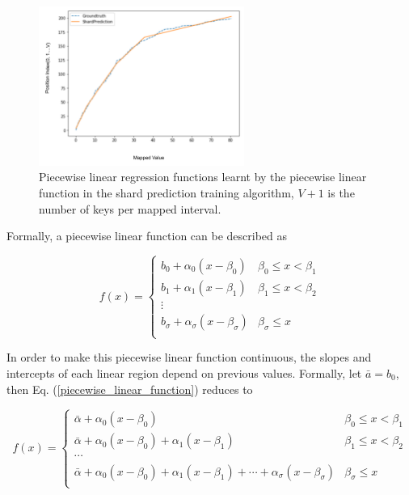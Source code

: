 \begin{figure}[t]
    \centering
	\includegraphics[width=0.6\textwidth]{graphs/implementation/shardPrediction.pdf}
    \caption{Piecewise linear regression functions learnt by the piecewise linear function in the shard prediction training algorithm, $V+1$ is the number of keys per mapped interval.}
    \label{shardPrediction}
\end{figure}

Formally, a piecewise linear function can be described as 

\begin{equation}
\label{piecewise_linear_function}
	f(x)= \begin{cases} 
      b_0+\alpha_0(x-\beta_0) & \beta_0\leq x < \beta_1 \\
      b_1+\alpha_1(x-\beta_1) &  \beta_1\leq x < \beta_2 \\
      \vdots \\
      b_\sigma+\alpha_\sigma(x-\beta_\sigma) &  \beta_\sigma\leq x \\
   \end{cases}
\end{equation}

In order to make this piecewise linear function continuous, the slopes and intercepts of each linear region depend on previous values. Formally, let $\bar{a}=b_0$, then Eq. (\ref{piecewise_linear_function}) reduces to

\begin{equation}
	\label{continuous_piecewise_linear_function}
	f(x)= \begin{cases} 
      \bar{\alpha}+\alpha_0(x-\beta_0) & \beta_0\leq x < \beta_1 \\
      \bar{\alpha}+\alpha_0(x-\beta_0) + \alpha_1(x-\beta_1) &  \beta_1\leq x < \beta_2 \\
      \cdots \\
      \bar{\alpha}+\alpha_0(x-\beta_0) + \alpha_1(x-\beta_1)+\cdots+\alpha_\sigma(x-\beta_\sigma) &  \beta_\sigma\leq x \\
   \end{cases}
\end{equation}


